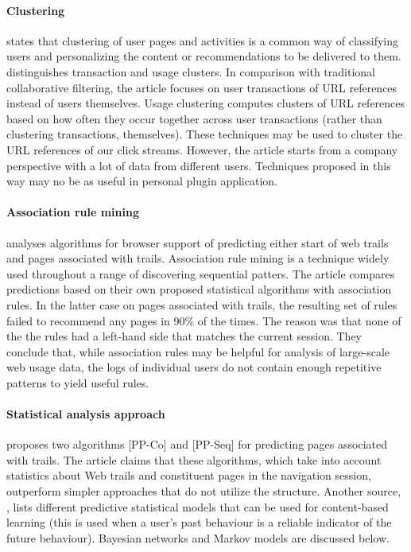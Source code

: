 \documentclass[a4paper,11pt]{article}
\begin{document}
\paragraph{Clustering} \cite{microsoft-smartfavorites} states that clustering of user pages and activities is a common way of classifying users and  personalizing the content or recommendations to be delivered to them. \cite{automatic-personalization} distinguishes transaction and usage clusters. In comparison with traditional collaborative filtering, the article focuses on user transactions of URL references instead of users themselves. Usage clustering computes clusters of URL references based on how often they occur together across user transactions (rather than clustering transactions, themselves). These techniques may be used to cluster the URL references of our click streams. However, the article starts from a company perspective with a lot of data from different users. Techniques proposed in this way may no be as useful in personal plugin application.

\paragraph{Association rule mining} \cite{microsoft-smartfavorites} analyses algorithms for browser  support of predicting either start of web trails and pages associated with trails. Association rule mining is a technique widely used throughout a range of  discovering sequential patters. The article compares predictions based on their own proposed statistical algorithms with association rules. In the latter case on pages associated with trails, the resulting set of rules failed to recommend any pages in 90\% of the times. The reason was that none of the the rules had a left-hand side that matches the current session. They conclude that, while association rules may be helpful for analysis of large-scale web usage data, the logs of individual users do not contain enough repetitive patterns to yield useful rules.

\paragraph{Statistical analysis approach} \cite{microsoft-smartfavorites} proposes two algorithms [PP-Co] and [PP-Seq] for predicting pages associated with trails. The article claims that these algorithms, which take into account statistics about Web trails and constituent pages in the navigation session, outperform  simpler approaches that do not utilize the structure. Another source, \cite{predictive-statistical-models}, lists different predictive statistical models that can be used for content-based learning (this is used when a user's past behaviour is a reliable indicator of the future behaviour). Bayesian networks and Markov models are discussed below.
\end{document}
